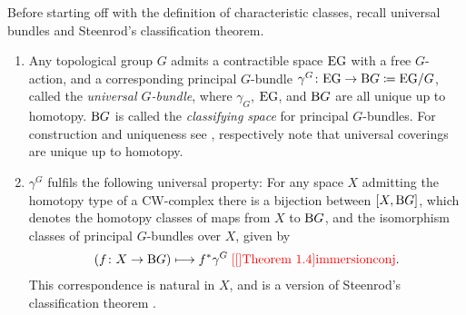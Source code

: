 Before starting off with the definition of characteristic classes,
recall universal bundles and Steenrod's classification theorem.
\begin{LemDef}\label{def:charcls}
  \begin{enumerate}
  \item Any topological group $G$ admits a contractible space $\mathrm{E}\mathrm{G}$ with a
    free $G$-action, and a corresponding principal $G$-bundle
    $\gamma^G\colon \mathrm{E}\mathrm{G}\to\mathrm{B}G\coloneqq \mathrm{E}\mathrm{G}/G$, called the
    \emph{universal $G$-bundle},
    where $\gamma_G$, $\mathrm{E}\mathrm{G}$, and $\mathrm{B}G$ are all unique up to
    homotopy.
    $\mathrm{B}G$ is called the \emph{classifying space} for principal
    $G$-bundles.
    For construction and uniqueness see \cite[Example~1B.7~ff.]{hatcher},
    respectively note that universal coverings are unique up to homotopy.
  \item\label{item:classificationthm}
    $\gamma^G$ fulfils the following universal property:
    For any space $X$ admitting the homotopy type of a CW-complex
    there is a bijection between $[X,\mathrm{B}G]$, which denotes the homotopy
    classes of maps from $X$ to $\mathrm{B}G$, and the isomorphism classes of
    principal $G$-bundles over $X$, given by
    \begin{gather*}
      \left(f\colon X\to\BG \right) \longmapsto \pb f \gamma^G
      \;
      \text{\optcite[Theorem 1.4]{immersionconj}}.
    \end{gather*}
    This correspondence is natural in $X$, and is a version of
    Steenrod's classification theorem
    \cite[Theorem~14.4.1]{tomdieck}.
  \end{enumerate}
\end{LemDef}

